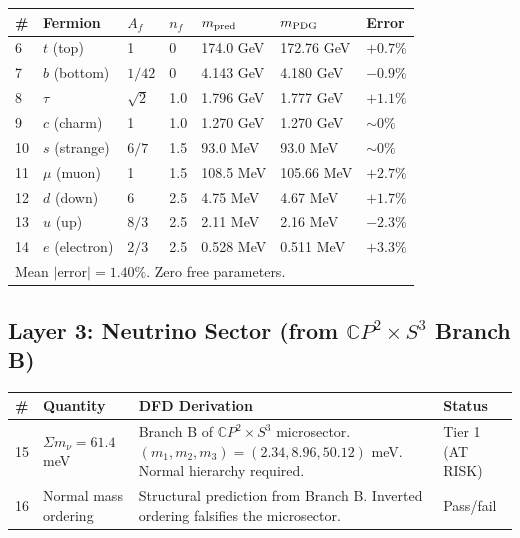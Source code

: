 \documentclass[12pt,a4paper]{article}
\newcommand{\CP}{\mathbb{C}P}
\begin{document}
\begin{longtable}{p{0.5cm}p{2.2cm}p{1.5cm}p{1cm}p{2.2cm}p{2.2cm}p{1.5cm}}
\toprule
\# & \textbf{Fermion} & $A_f$ & $n_f$ & $m_{\rm pred}$ &
  $m_{\rm PDG}$ & Error \\
\midrule
\endhead
6  & $t$ (top)     & 1          & 0   & 174.0 GeV  & 172.76 GeV & $+0.7\%$ \\
7  & $b$ (bottom)  & $1/42$     & 0   & 4.143 GeV  & 4.180 GeV  & $-0.9\%$ \\
8  & $\tau$        & $\sqrt{2}$ & 1.0 & 1.796 GeV  & 1.777 GeV  & $+1.1\%$ \\
9  & $c$ (charm)   & 1          & 1.0 & 1.270 GeV  & 1.270 GeV  & $\sim 0\%$ \\
10 & $s$ (strange) & $6/7$      & 1.5 & 93.0 MeV   & 93.0 MeV   & $\sim 0\%$ \\
11 & $\mu$ (muon)  & 1          & 1.5 & 108.5 MeV  & 105.66 MeV & $+2.7\%$ \\
12 & $d$ (down)    & 6          & 2.5 & 4.75 MeV   & 4.67 MeV   & $+1.7\%$ \\
13 & $u$ (up)      & $8/3$      & 2.5 & 2.11 MeV   & 2.16 MeV   & $-2.3\%$ \\
14 & $e$ (electron)& $2/3$      & 2.5 & 0.528 MeV  & 0.511 MeV  & $+3.3\%$ \\
\midrule
\multicolumn{6}{l}{Mean $|$error$| = 1.40\%$.  Zero free parameters.} \\
\bottomrule
\end{longtable}

\subsection{Layer 3: Neutrino Sector (from $\CP^2 \times S^3$ Branch B)}

\begin{longtable}{p{0.5cm}p{4.5cm}p{6cm}p{2.5cm}}
\toprule
\# & \textbf{Quantity} & \textbf{DFD Derivation} & \textbf{Status} \\
\midrule
\endhead
15 & $\Sigma m_\nu = 61.4$ meV &
  Branch B of $\CP^2 \times S^3$ microsector.
  $(m_1, m_2, m_3) = (2.34, 8.96, 50.12)$ meV.
  Normal hierarchy required. &
  Tier 1 (AT RISK) \\[4pt]

16 & Normal mass ordering &
  Structural prediction from Branch B.
  Inverted ordering falsifies the microsector. &
  Pass/fail \\[4pt]

\bottomrule
\end{longtable}
\end{document}
